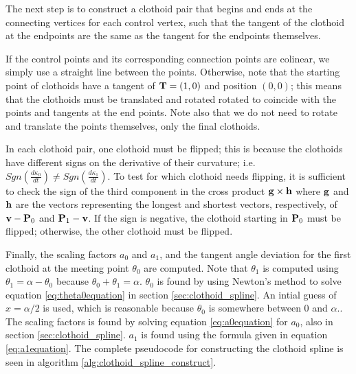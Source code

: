 The next step is to  construct a clothoid pair that begins and ends at the connecting vertices for each control vertex, such that the tangent of the clothoid at the endpoints are the same as the tangent for the endpoints themselves. 

If the control points and its corresponding connection points are colinear, we simply use a straight line between the points. Otherwise, note that the starting point of clothoids have a tangent of ${\mathbf T} = (1,0)$ and position $(0,0)$; this means that the clothoids must be translated and rotated rotated  to coincide with the points and tangents at the end points. Note also that we do not need to rotate and translate the points themselves, only the final clothoids. 

In each clothoid pair, one clothoid must be flipped; this is because the clothoids have different signs on the derivative of their curvature; i.e. $Sgn(\frac{d\kappa_{0}}{dt})\neq Sgn(\frac{d\kappa_{1}}{dt})$.  To test for which clothoid needs flipping, it is sufficient to check the sign of the third component in the cross product ${\mathbf g}\times {\mathbf h}$ where ${\mathbf g}$ and ${\mathbf h}$ are the vectors representing the longest and shortest vectors, respectively, of ${\mathbf v}-{\mathbf P}_0$ and ${\mathbf P}_1 - {\mathbf v}$. If the sign is negative, the clothoid starting in ${\mathbf P}_0$ must be flipped; otherwise, the other clothoid must be flipped.

Finally, the scaling factors $a_0$ and $a_1$, and the tangent angle deviation for the first clothoid at the meeting point $\theta_0$ are computed. Note that $\theta_1$ is computed using $\theta_1 = \alpha - \theta_0$ because $\theta_0 + \theta_1 = \alpha$\cite{clothoid}. $\theta_0$ is found by using Newton's method to solve equation \ref{eq:theta0equation} in section \ref{sec:clothoid_spline}. An intial guess of $x=\alpha/2$ is used, which is reasonable because $\theta_0$ is somewhere between $0$ and $\alpha$.\cite{clothoid}. The scaling factors is found by solving equation \ref{eq:a0equation} for $a_0$, also in section \ref{sec:clothoid_spline}. $a_1$ is found using the formula given in equation \ref{eq:a1equation}. The complete pseudocode for constructing the clothoid spline is seen in algorithm \ref{alg:clothoid_spline_construct}.

